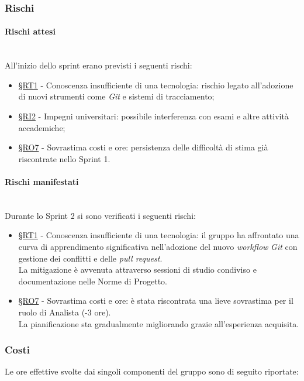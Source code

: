 \documentclass[10pt, letterpaper]{article}
\newcommand{\trisubsection}[1]{\paragraph{#1}\mbox{}\\}
\newcommand{\rif}[1]{\hyperref[#1]{§#1}}
\begin{document}
\subsubsection{Rischi}
\trisubsection{Rischi attesi}
All'inizio dello sprint erano previsti i seguenti rischi:
\begin{itemize}
    \item \rif{RT1} - Conoscenza insufficiente di una tecnologia: rischio legato all'adozione di nuovi strumenti come \textit{Git} e sistemi di tracciamento;
    \item \rif{RI2} - Impegni universitari: possibile interferenza con esami e altre attività accademiche;
    \item \rif{RO7} - Sovrastima costi e ore: persistenza delle difficoltà di stima già riscontrate nello Sprint 1.
\end{itemize}

\trisubsection{Rischi manifestati}
Durante lo Sprint 2 si sono verificati i seguenti rischi:
\begin{itemize}
    \item \rif{RT1} - Conoscenza insufficiente di una tecnologia: il gruppo ha affrontato una curva di apprendimento significativa nell'adozione del nuovo \textit{workflow} \textit{Git} con gestione dei conflitti e delle \textit{pull request}.
          \\La mitigazione è avvenuta attraverso sessioni di studio condiviso e documentazione nelle Norme di Progetto.
    \item \rif{RO7} - Sovrastima costi e ore: è stata riscontrata una lieve sovrastima per il ruolo di Analista (-3 ore).
          \\La pianificazione sta gradualmente migliorando grazie all'esperienza acquisita.
\end{itemize}

\subsubsection{Costi}
Le ore effettive svolte dai singoli componenti del gruppo sono di seguito riportate:

\setRuoloFilippo{\Anal}
\setRuoloChristian{\Anal}
\setRuoloValeria{\Verif}
\setRuoloGiuseppe{\Resp}
\setRuoloFrancesco{\Amm}
\setRuoloLuca{\Anal}
\setRuoloLeonardo{\Proge}

\end{document}
